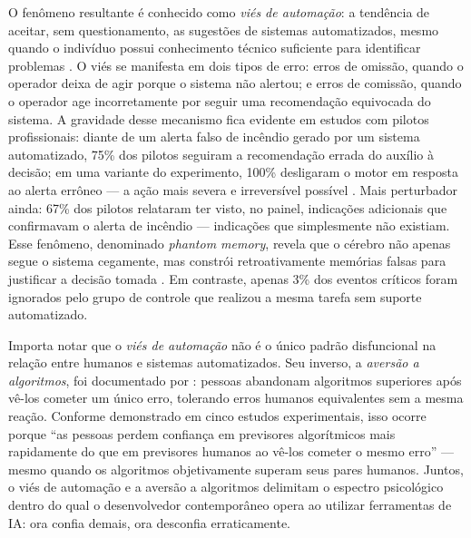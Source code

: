 O fenômeno resultante é conhecido como \textit{viés de automação}: a tendência de aceitar, sem questionamento, as sugestões de sistemas automatizados, mesmo quando o indivíduo possui conhecimento técnico suficiente para identificar problemas \cite{mosier1998}. O viés se manifesta em dois tipos de erro: erros de omissão, quando o operador deixa de agir porque o sistema não alertou; e erros de comissão, quando o operador age incorretamente por seguir uma recomendação equivocada do sistema. A gravidade desse mecanismo fica evidente em estudos com pilotos profissionais: diante de um alerta falso de incêndio gerado por um sistema automatizado, 75\% dos pilotos seguiram a recomendação errada do auxílio à decisão; em uma variante do experimento, 100\% desligaram o motor em resposta ao alerta errôneo — a ação mais severa e irreversível possível \cite{mosier1998}. Mais perturbador ainda: 67\% dos pilotos relataram ter visto, no painel, indicações adicionais que confirmavam o alerta de incêndio — indicações que simplesmente não existiam. Esse fenômeno, denominado \textit{phantom memory}, revela que o cérebro não apenas segue o sistema cegamente, mas constrói retroativamente memórias falsas para justificar a decisão tomada \cite{mosier1998}. Em contraste, apenas 3\% dos eventos críticos foram ignorados pelo grupo de controle que realizou a mesma tarefa sem suporte automatizado.

Importa notar que o \textit{viés de automação} não é o único padrão disfuncional na relação entre humanos e sistemas automatizados. Seu inverso, a \textit{aversão a algoritmos}, foi documentado por : pessoas abandonam algoritmos superiores após vê-los cometer um único erro, tolerando erros humanos equivalentes sem a mesma reação. Conforme demonstrado em cinco estudos experimentais, isso ocorre porque ``as pessoas perdem confiança em previsores algorítmicos mais rapidamente do que em previsores humanos ao vê-los cometer o mesmo erro'' — mesmo quando os algoritmos objetivamente superam seus pares humanos. Juntos, o viés de automação e a aversão a algoritmos delimitam o espectro psicológico dentro do qual o desenvolvedor contemporâneo opera ao utilizar ferramentas de IA: ora confia demais, ora desconfia erraticamente.

